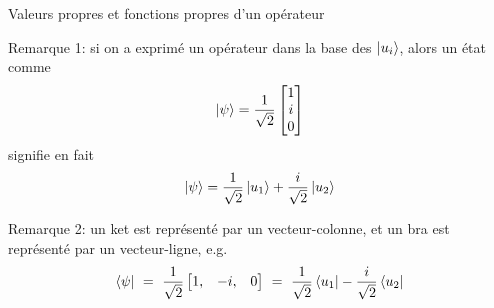 \documentclass[xcolor=svgnames,t,aspectratio=169,handout]{uqtrcours}
\begin{document}
\begin{frame}{Valeurs propres et fonctions propres d'un opérateur}

Remarque 1: si on a exprimé un opérateur dans la base
  des $\ket{u_i}$, alors un état comme
\begin{align}
  \ket{\psi} =
  \frac{1}{\sqrt{2}}
  \begin{bmatrix}
    1 \\
    i \\
    0 \\
  \end{bmatrix}
\end{align}
signifie en fait
\begin{align}
  \ket{\psi} = \frac{1}{\sqrt{2}} \ket{u_1} + \frac{i}{\sqrt{2}} \ket{u_2}
\end{align}

Remarque 2: un ket est représenté par un vecteur-colonne,
  et un bra est représenté par un vecteur-ligne, e.g.
\begin{align}
  \bra{\psi}
  \ = \
  \frac{1}{\sqrt{2}}
  \begin{bmatrix}
    1  , &
    -i , &
    0 \\
  \end{bmatrix}
  \ = \
  \frac{1}{\sqrt{2}} \bra{u_1} - \frac{i}{\sqrt{2}} \bra{u_2}
\end{align}

\end{frame}
\end{document}
